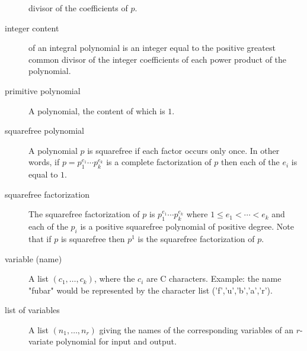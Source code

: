 \begin{description}
  divisor of the coefficients of $p$.
\item[integer content]
  of an integral polynomial is an integer equal to the positive greatest
  common divisor of the integer coefficients of each power product of the
  polynomial.
\item[primitive polynomial]
  A polynomial, the content of which is $1$.
\item[squarefree polynomial]
  A polynomial $p$ is squarefree if each factor occurs only once. In
  other words, if $p = p_1^{e_1} \cdots p_k^{e_k}$ is a complete
  factorization of $p$ then each of the $e_i$ is equal to $1$.
\item[squarefree factorization]
  The squarefree factorization of $p$ is $p_1^{e_1} \cdots p_k^{e_k}$
  where $1 \leq e_1 < \cdots < e_k$ and each of the $p_i$ is a positive
  squarefree polynomial of positive degree.  Note that if $p$ is
  squarefree then $p^1$ is the squarefree factorization of $p$.
\item[variable (name)]
  A list $(c_1, \ldots, c_k)$, where the $c_i$ are C characters. Example: the
  name "fubar" would be represented by the character list
  ('f','u','b','a','r').
\item[list of variables]
  A list $(n_1, \ldots, n_r)$ giving the names of the corresponding
  variables of an $r$-variate polynomial for input and output.
\end{description}
